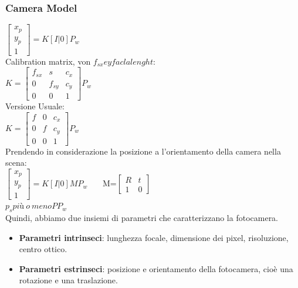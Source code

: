 \subsubsection{Camera Model}
$\begin{bmatrix}
    x_p \\
    y_p \\
    1      
\end{bmatrix}= K[I|0]P_w $
\\ Calibration matrix, von $f_{sx} e y facla lenght$: \\
$K= \begin{bmatrix}
    f_{sx}  & s & c_x \\
    0 & f_{sy} & c_y \\
    0 & 0 & 1      
\end{bmatrix}P_w$ \\
Versione Usuale: \\
$K= \begin{bmatrix}
    f  & 0 & c_x \\
    0 & f & c_y \\
    0 & 0 & 1      
\end{bmatrix}P_w$
\\ Prendendo in considerazione la posizione a l'orientamento della camera nella scena: \\
$\begin{bmatrix}
    x_p \\
    y_p \\
    1      
\end{bmatrix}= K[I|0]MP_w $
 \ \ \
 M=$\begin{bmatrix}
    R & t \\
    1 & 0  
\end{bmatrix}$
\\
$p_s più \ o \ meno PP_w$  \\
Quindi, abbiamo due insiemi di parametri che caratterizzano la fotocamera.
\begin{itemize}
    \item \textbf{Parametri intrinseci}: lunghezza focale, dimensione dei pixel, risoluzione, centro ottico.
    \item \textbf{Parametri estrinseci}: posizione e orientamento della fotocamera, cioè una rotazione e una traslazione.
\end{itemize}
